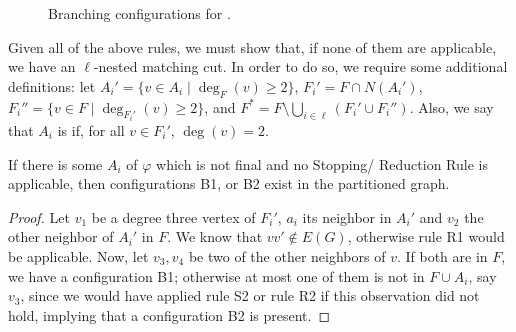 \begin{figure}[!htb]
	\caption{\label{fig:nested_branches} Branching configurations for .}
\end{figure}

Given all of the above rules, we must show that, if none of them are applicable, we have an $\ell$-nested matching cut.
In order to do so, we require some additional definitions: let $A_i' = \{v \in A_i \mid \deg_F(v) \geq 2\}$,  $F_i' = F \cap N(A_i')$, $F_i'' = \{v \in F \mid \deg_{F_i'}(v) \geq 2\}$, and $F^* = F \setminus \bigcup_{i \in \ell} (F_i' \cup F_i'')$.
Also, we say that $A_i$ is  if, for all $v \in F_i'$, $\deg(v) = 2$.

\begin{lemma}
	If there is some $A_i$ of $\varphi$ which is not final and no Stopping/ Reduction Rule is applicable, then configurations B1, or B2 exist in the partitioned graph.
\end{lemma}

\begin{proof}
	Let $v_1$ be a degree three vertex of $F_i'$, $a_i$ its neighbor in $A_i'$ and $v_2$ the other neighbor of $A_i'$ in $F$.
	We know that $vv' \notin E(G)$, otherwise rule R1 would be applicable.
	Now, let $v_3,v_4$ be two of the other neighbors of $v$.
	If both are in $F$, we have a configuration B1; otherwise at most one of them is not in $F \cup A_i$, say $v_3$, since we would have applied rule S2 or rule R2 if this observation did not hold, implying that a configuration B2 is present.
\end{proof}

